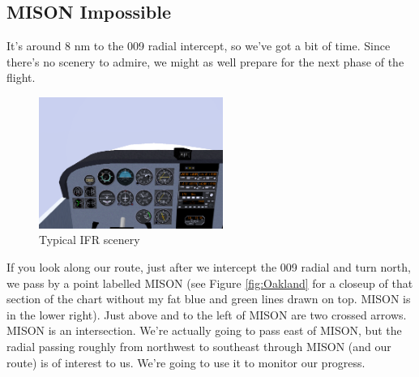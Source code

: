 \subsection{MISON Impossible}

It's around 8 nm to the 009 radial intercept, so we've got a bit of
time.  Since there's no scenery to admire, we might as well prepare
for the next phase of the flight.

\begin{figure}
  \begin{center}
    \includegraphics[width=6cm]{img/murk.png}
    \caption{Typical IFR scenery}
    \label{fig:murk}
  \end{center}
\end{figure}

If you look along our route, just after we intercept the 009 radial
and turn north, we pass by a point labelled MISON (see Figure
\ref{fig:Oakland} for a closeup of that section of the chart without
my fat blue and green lines drawn on top.  MISON is in the lower
right).  Just above and to the left of MISON are two crossed arrows.
MISON is an intersection.  We're actually going to pass east of MISON,
but the radial passing roughly from northwest to southeast through
MISON (and our route) is of interest to us.  We're going to use it to
monitor our progress.

